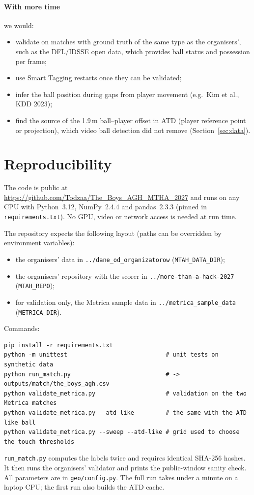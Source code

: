 \documentclass[11pt,a4paper]{article}
\newcommand{\code}[1]{\texttt{#1}}
\begin{document}
\paragraph{With more time} we would:
\begin{itemize}
  \item validate on matches with ground truth of the same type as the organisers', such as the DFL/IDSSE open data,
    which provides ball status and possession per frame;
  \item use Smart Tagging restarts once they can be validated;
  \item infer the ball position during gaps from player movement (e.g.\ Kim et al., KDD 2023);
  \item find the source of the 1.9\,m ball--player offset in ATD (player reference point or projection), which video
    ball detection did not remove (Section~\ref{sec:data}).
\end{itemize}

\section{Reproducibility}
\label{sec:repro}
The code is public at \url{https://github.com/Todzaa/The_Boys_AGH_MTHA_2027} and runs on any CPU with Python~3.12,
NumPy~2.4.4 and pandas~2.3.3 (pinned in \code{requirements.txt}). No GPU, video or network access is needed at run
time.

\noindent The repository expects the following layout (paths can be overridden by environment variables):
\begin{itemize}
  \item the organisers' data in \code{../dane\_od\_organizatorow} (\code{MTAH\_DATA\_DIR});
  \item the organisers' repository with the scorer in \code{../more-than-a-hack-2027} (\code{MTAH\_REPO});
  \item for validation only, the Metrica sample data in \code{../metrica\_sample\_data} (\code{METRICA\_DIR}).
\end{itemize}

\noindent Commands:
\begin{verbatim}
pip install -r requirements.txt
python -m unittest                            # unit tests on synthetic data
python run_match.py                           # -> outputs/match/the_boys_agh.csv
python validate_metrica.py                    # validation on the two Metrica matches
python validate_metrica.py --atd-like         # the same with the ATD-like ball
python validate_metrica.py --sweep --atd-like # grid used to choose the touch thresholds
\end{verbatim}
\code{run\_match.py} computes the labels twice and requires identical SHA-256 hashes. It then runs the organisers'
validator and prints the public-window sanity check. All parameters are in \code{geo/config.py}. The full run takes
under a minute on a laptop CPU; the first run also builds the ATD cache.
\end{document}
